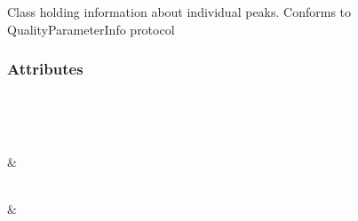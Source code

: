 \documentclass[letterpaper,10pt,english]{sphinxmanual}
\begin{document}
\begin{fulllineitems}
\label{\detokenize{generated/quality_assessment.data_types.PeakInfo:quality_assessment.data_types.PeakInfo}}
\sphinxAtStartPar
Class holding information about individual peaks.
Conforms to QualityParameterInfo protocol
\subsubsection*{Attributes}


\begin{savenotes}\sphinxatlongtablestart\begin{longtable}[c]{}
\hline

\endfirsthead

%
{}\\
\hline

\endhead

\hline
{}\\
\endfoot

\endlastfoot

\sphinxAtStartPar
{\hyperref[\detokenize{generated/quality_assessment.data_types.PeakInfo.description:quality_assessment.data_types.PeakInfo.description}]{}}
&
\sphinxAtStartPar

\\
\hline
\sphinxAtStartPar
{\hyperref[\detokenize{generated/quality_assessment.data_types.PeakInfo.width:quality_assessment.data_types.PeakInfo.width}]{}}
&
\sphinxAtStartPar


\end{longtable}
\end{savenotes}
\end{fulllineitems}
\end{document}
